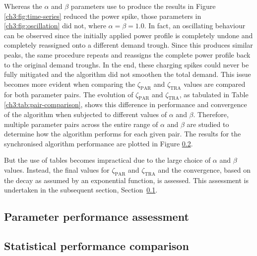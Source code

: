 

Whereas the $\alpha$ and $\beta$ parameters use to produce the results in Figure \ref{ch3:fig:time-series} reduced the power spike, those parameters in \ref{ch3:fig:oscillation} did not, where $\alpha = \beta = 1.0$.
In fact, an oscillating behaviour can be observed since the initially applied power profile is completely undone and completely reassigned onto a different demand trough.
Since this produces similar peaks, the same procedure repeats and reassigns the complete power profile back to the original demand troughs.
In the end, these charging spikes could never be fully mitigated and the algorithm did not smoothen the total demand.
This issue becomes more evident when comparing the $\zeta_\text{PAR}$ and $\zeta_\text{TRA}$ values are compared for both parameter pairs.
The evolution of $\zeta_\text{PAR}$ and $\zeta_\text{TRA}$, as tabulated in Table \ref{ch3:tab:pair-comparison}, shows this difference in performance and convergence of the algorithm when subjected to different values of $\alpha$ and $\beta$.
Therefore, multiple parameter pairs across the entire range of $\alpha$ and $\beta$ are studied to determine how the algorithm performs for each given pair.
The results for the synchronised algorithm performance are plotted in Figure \ref{}.

But the use of tables becomes impractical due to the large choice of $\alpha$ and $\beta$ values.
Instead, the final values for $\zeta_\text{PAR}$ and $\zeta_\text{TRA}$ and the convergence, based on the decay as assumed by an exponential function, is assessed.
This assessment is undertaken in the subsequent section, Section~\ref{ch3:subsec:parameter-performance-assessment}.

\subsection{Parameter performance assessment}
\label{ch3:subsec:parameter-performance-assessment}

\subsection{Statistical performance comparison}
